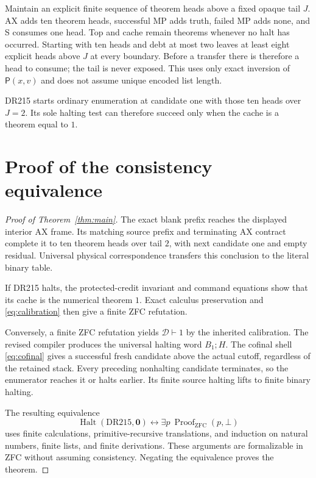 \documentclass[11pt,a4paper]{article}
\theoremstyle{definition}
\newcommand{\pair}{\mathsf P}
\newcommand{\calD}{\mathcal D}
\newcommand{\Halt}{\operatorname{Halt}}
\newcommand{\blank}{\mathbf 0}
\numberwithin{equation}{section}
\begin{document}
Maintain an explicit finite sequence of theorem heads above a fixed
opaque tail $J$. AX adds ten theorem heads, successful MP adds truth,
failed MP adds none, and S consumes one head. Top and cache remain
theorems whenever no halt has occurred. Starting with ten heads and
debt at most two leaves at least eight explicit heads above $J$ at
every boundary. Before a transfer there is therefore a head to consume;
the tail is never exposed. This uses only exact inversion of
$\pair(x,v)$ and does not assume unique encoded list length.

DR215 starts ordinary enumeration at candidate one with those ten heads
over $J=2$. Its sole halting test can therefore succeed only when the
cache is a theorem equal to $1$.

\section{Proof of the consistency equivalence}
\label{sec:mainproof}

\begin{proof}[Proof of Theorem~\ref{thm:main}]
The exact blank prefix reaches the displayed interior AX frame.
Its matching source prefix and terminating AX contract complete it to
ten theorem heads over tail $2$, with next candidate one and empty
residual. Universal physical correspondence transfers this conclusion
to the literal binary table.

If DR215 halts, the protected-credit invariant and command equations
show that its cache is the numerical theorem $1$. Exact calculus
preservation and \eqref{eq:calibration} then give a finite ZFC refutation.

Conversely, a finite ZFC refutation yields $\calD\vdash1$ by the
inherited calibration. The revised compiler produces the universal
halting word $B_1;H$. The cofinal shell \eqref{eq:cofinal} gives a
successful fresh candidate above the actual cutoff, regardless of the
retained stack. Every preceding nonhalting candidate terminates, so the
enumerator reaches it or halts earlier. Its finite source halting lifts
to finite binary halting.

The resulting equivalence
\[
 \Halt(\mathrm{DR215},\blank)
 \longleftrightarrow
 \exists p\ \operatorname{Proof}_{\mathrm{ZFC}}(p,\bot)
\]
uses finite calculations, primitive-recursive translations, and
induction on natural numbers, finite lists, and finite derivations.
These arguments are formalizable in ZFC without assuming consistency.
Negating the equivalence proves the theorem.
\end{proof}
\end{document}
